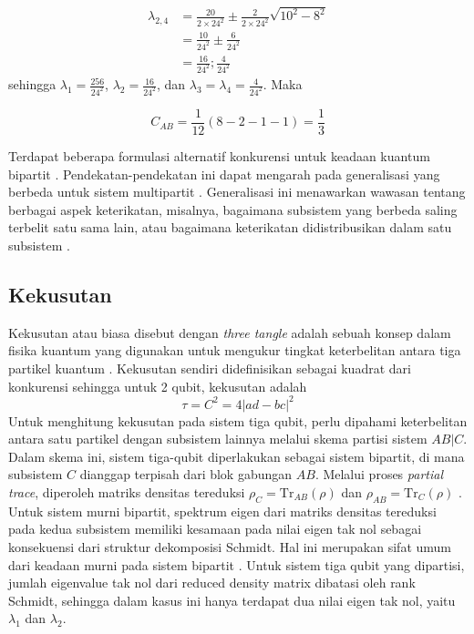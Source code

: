 \begin{equation}
	\begin{aligned}
		\lambda_{2,4}
		&=\frac{20}{2\times24^2}\pm\frac{2}{2\times24^2}\sqrt{10^2-8^2}\\
		&=\frac{10}{24^2}\pm\frac{6}{24^2}\\
		&=\frac{16}{24^2}; \frac{4}{24^2}
	\end{aligned}
\end{equation}
sehingga $\lambda_1=\frac{256}{24^2}$, $\lambda_2=\frac{16}{24^2}$, dan $
\lambda_3=\lambda_4=\frac{4}{24^2}$. Maka

\begin{equation}
	C_{AB}=\frac{1}{12}(8-2-1-1)=\frac{1}{3}
\end{equation}

\par
Terdapat beberapa formulasi alternatif konkurensi untuk keadaan kuantum bipartit \cite{horodecki2009quantum,Aggarwal2021}. Pendekatan-pendekatan ini dapat mengarah pada generalisasi yang berbeda untuk sistem multipartit \cite{Li2024,Zhu2020}. Generalisasi ini menawarkan wawasan tentang berbagai aspek keterikatan, misalnya,
bagaimana subsistem yang berbeda saling terbelit satu sama lain, atau bagaimana keterikatan didistribusikan dalam satu subsistem \cite{Cornelio2013}.

\subsection{Kekusutan}
\par
Kekusutan atau biasa disebut dengan \textit{three tangle} adalah sebuah konsep dalam fisika kuantum yang digunakan untuk mengukur tingkat keterbelitan antara tiga partikel kuantum \cite{amico2008entanglement, eltschka2014quantum}. Kekusutan sendiri didefinisikan sebagai kuadrat dari konkurensi sehingga untuk 2 qubit, kekusutan adalah
\begin{equation*}
	\tau = C^2 = 4|ad - bc|^2
\end{equation*}
Untuk menghitung kekusutan pada sistem tiga qubit, perlu dipahami keterbelitan antara satu partikel dengan subsistem lainnya melalui skema partisi sistem $AB|C$. Dalam skema ini, sistem tiga-qubit diperlakukan sebagai sistem bipartit, di mana subsistem $C$ dianggap terpisah dari blok gabungan $AB$. Melalui proses \textit{partial trace}, diperoleh matriks densitas tereduksi $\rho_C = \mathrm{Tr}_{AB}(\rho)$ dan $\rho_{AB} = \mathrm{Tr}_{C}(\rho)$ \cite{Wootters1998, rungta2001universal}. Untuk sistem murni bipartit, spektrum eigen dari matriks densitas tereduksi pada kedua subsistem memiliki kesamaan pada nilai eigen tak nol sebagai konsekuensi dari struktur dekomposisi Schmidt. Hal ini merupakan sifat umum dari keadaan murni pada sistem bipartit \cite{osborne2006general}. Untuk sistem tiga qubit yang dipartisi, jumlah eigenvalue tak nol dari reduced density matrix dibatasi oleh rank Schmidt, sehingga dalam kasus ini hanya terdapat dua nilai eigen tak nol, yaitu $\lambda_1$ dan $\lambda_2$.

